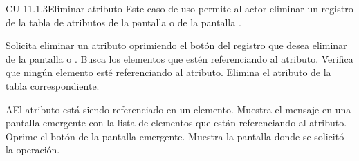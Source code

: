 \newpage 
\begin{UseCase}{CU 11.1.3}{Eliminar atributo}
	{
		Este caso de uso permite al actor eliminar un registro de la tabla de atributos de la pantalla  o de la pantalla .
	}
	
	


\end{UseCase}
 \begin{UCtrayectoria}
    \UCpaso[\UCactor] Solicita eliminar un atributo oprimiendo el botón \btnEliminar del registro que desea eliminar de la pantalla  o .
    \UCpaso[\UCsist] Busca los elementos que estén referenciando al atributo.
    \UCpaso[\UCsist] Verifica que ningún elemento esté referenciando al atributo. 
    \UCpaso[\UCsist] Elimina el atributo de la tabla correspondiente.
 \end{UCtrayectoria}
 \begin{UCtrayectoriaA}{A}{El atributo está siendo referenciado en un elemento.}
    \UCpaso[\UCsist] Muestra el mensaje  en una pantalla emergente
    con la lista de elementos que están referenciando al atributo.
    \UCpaso[\UCactor] Oprime el botón  de la pantalla emergente.
    \UCpaso[\UCsist] Muestra la pantalla donde se solicitó la operación.
 \end{UCtrayectoriaA}
